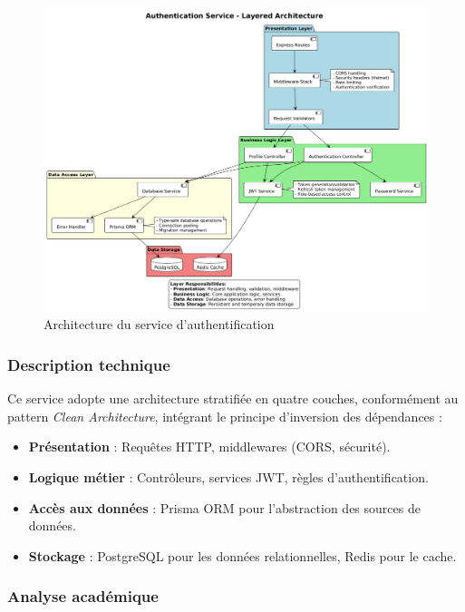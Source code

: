 \documentclass{rapportPfe}
\begin{document}
\begin{figure}[H]
    \centering
    \includegraphics[width=1.1\textwidth]{diagrams/diagram2.png}
    \caption{Architecture du service d’authentification}
    \label{fig:diagram2}
\end{figure}

\subsubsection*{Description technique}

Ce service adopte une architecture stratifiée en quatre couches, conformément au pattern \textit{Clean Architecture}, intégrant le principe d’inversion des dépendances :

\begin{itemize}[label=--]
    \item \textbf{Présentation} : Requêtes HTTP, middlewares (CORS, sécurité).
    \item \textbf{Logique métier} : Contrôleurs, services JWT, règles d’authentification.
    \item \textbf{Accès aux données} : Prisma ORM pour l’abstraction des sources de données.
    \item \textbf{Stockage} : PostgreSQL pour les données relationnelles, Redis pour le cache.
\end{itemize}

\subsubsection*{Analyse académique}
\end{document}
